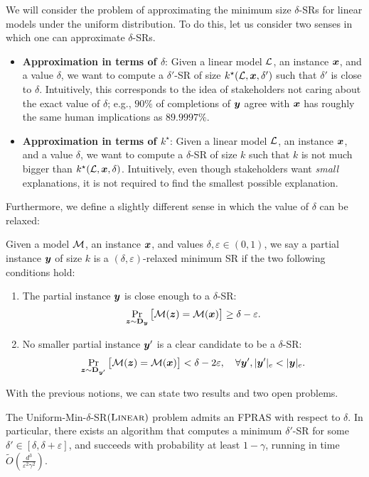 We will consider the problem of approximating the minimum size $\delta$-SRs for linear models under the uniform distribution. To do this, let us consider two senses in which one can approximate $\delta$-SRs.
\begin{itemize}
    \item \textbf{Approximation in terms of $\delta$}: Given a linear model $\mathcal{L}$, an instance ${\bm{x}}$, and a value $\delta$, we want to compute a $\delta'$-SR of size $k^\star(\mathcal{L}, {\bm{x}}, \delta')$ such that $\delta'$ is close to $\delta$. Intuitively, this corresponds to the idea of stakeholders not caring about the exact value of $\delta$; e.g., $90\%$ of completions of ${\bm{y}}$ agree with ${\bm{x}}$ has roughly the same human implications as $89.9997\%$.
    \item \textbf{Approximation in terms of $k^\star$}: Given a linear model $\mathcal{L}$, an instance ${\bm{x}}$, and a value $\delta$, we want to compute a $\delta$-SR of size $k$ such that $k$ is not much bigger than $k^\star(\mathcal{L}, {\bm{x}}, \delta)$. Intuitively, even though stakeholders want \emph{small} explanations, it is not required to find the smallest possible explanation.
\end{itemize}

Furthermore, we define a slightly different sense in which the value of $\delta$ can be relaxed:

\begin{definition}
    Given a model $\mathcal{M}$, an instance ${\bm{x}}$, and values $\delta, \varepsilon \in (0, 1)$, we say a partial instance ${\bm{y}}$ of size $k$ is a $(\delta, \varepsilon)$-relaxed minimum SR if the two following conditions hold:
    \begin{enumerate}
        \item The partial instance ${\bm{y}}$ is close enough to a $\delta$-SR:
        \[
            \Pr_{{\bm{z}} \sim \mathbf{D}_{{\bm{y}}}}\big[\mathcal{M}({\bm{z}}) = \mathcal{M}({\bm{x}})\big] \geq \delta - \varepsilon.
        \]
        \item No smaller partial instance ${\bm{y}}'$ is a clear candidate to be a $\delta$-SR:
        \[
            \Pr_{{\bm{z}} \sim \mathbf{D}_{{\bm{y}}'}}\big[\mathcal{M}({\bm{z}}) = \mathcal{M}({\bm{x}})\big] < \delta - 2\varepsilon, \quad \forall {\bm{y}}', |{\bm{y}}'|_e < |{\bm{y}}|_e.
        \]
    \end{enumerate}
\end{definition}


With the previous notions, we can state two results and two open problems.
\begin{theorem}\label{thm:delta-approximation}
    The Uniform-Min-$\delta$-SR$(\textsc{Linear})$ problem admits an FPRAS with respect to $\delta$. In particular, there exists an algorithm that computes a minimum $\delta'$-SR for some $\delta' \in [\delta, \delta + \varepsilon]$, and succeeds with probability at least $1-\gamma$, running in time $\tilde{O}\left(\frac{d^3}{\varepsilon^2\gamma^2}\right)$.
\end{theorem}


